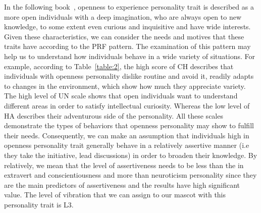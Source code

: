 In the following book~\cite{matthews2003personality}, openness to experience
personality trait is described as a more open individuals with a deep imagination,
who are always open to new knowledge, to some extent even curious and inquisitive and have wide interests.
Given these characteristics, we can consider the needs and motives that these traits have according to the PRF pattern.
The examination of this pattern may help us to understand how individuals behave in a wide variety of situations.
For example, according to Table~\ref{table:2}, the high score of CH describes that
individuals with openness personality dislike routine and avoid it, readily adapts to changes
in the environment, which show how much they appreciate variety.
The high level of UN scale shows that open individuals want to understand
different areas in order to satisfy intellectual curiosity.
Whereas the low level of HA describes their adventurous side of the personality.
All these scales demonstrate the types of behaviors that openness personality may show to fulfill their needs.
Consequently, we can make an assumption that individuals high in openness
personality trait generally behave in a relatively assertive manner
(i.e they take the initiative, lead discussions) in order to broaden their knowledge.
By relatively, we mean that the level of assertiveness needs to be less than the in
extravert and conscientiousness and more than neuroticism personality since they are the
main predictors of assertiveness and the results have high significant value.
The level of vibration that we can assign to our mascot with this personality trait is L3.
 

